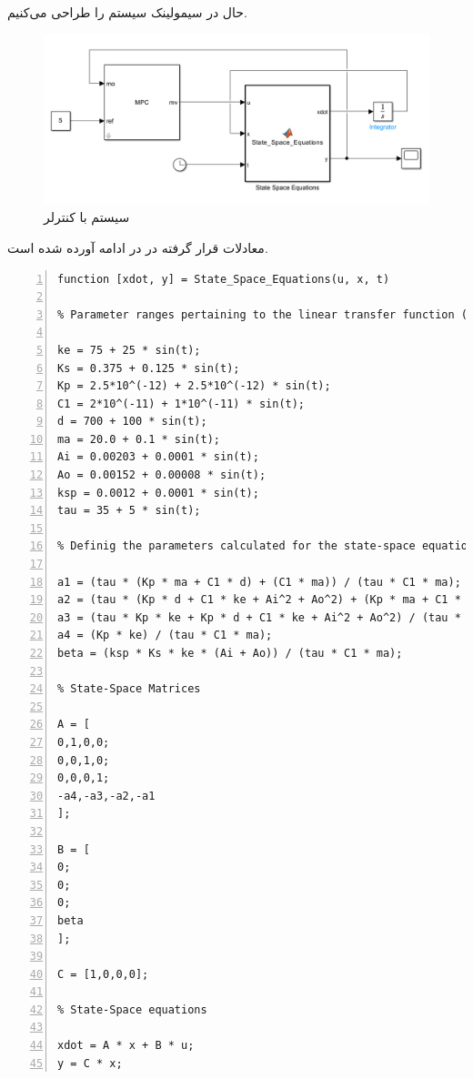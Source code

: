 \documentclass[14pt, a4paper]{extarticle}
\begin{document}
حال در سیمولینک سیستم را طراحی می‌کنیم.\\
\begin{figure}[h!]
	\centering
	\includegraphics[scale = 0.6]{Q1_2_sim.png}
	\caption{سیستم با کنترلر 
	}
\end{figure}
\newpage
معادلات قرار گرفته در 
در ادامه آورده شده است.\\
\begin{latin}
	\begin{lstlisting}[frame=single,numbers=left,style=Matlab-Pyglike]
function [xdot, y] = State_Space_Equations(u, x, t)

% Parameter ranges pertaining to the linear transfer function (Table 1)

ke = 75 + 25 * sin(t);
Ks = 0.375 + 0.125 * sin(t);
Kp = 2.5*10^(-12) + 2.5*10^(-12) * sin(t);
C1 = 2*10^(-11) + 1*10^(-11) * sin(t);
d = 700 + 100 * sin(t);
ma = 20.0 + 0.1 * sin(t);
Ai = 0.00203 + 0.0001 * sin(t);
Ao = 0.00152 + 0.00008 * sin(t);
ksp = 0.0012 + 0.0001 * sin(t);
tau = 35 + 5 * sin(t);      

% Definig the parameters calculated for the state-space equations

a1 = (tau * (Kp * ma + C1 * d) + (C1 * ma)) / (tau * C1 * ma);
a2 = (tau * (Kp * d + C1 * ke + Ai^2 + Ao^2) + (Kp * ma + C1 * d)) / (tau * C1 * ma);
a3 = (tau * Kp * ke + Kp * d + C1 * ke + Ai^2 + Ao^2) / (tau * C1 * ma);
a4 = (Kp * ke) / (tau * C1 * ma);
beta = (ksp * Ks * ke * (Ai + Ao)) / (tau * C1 * ma);

% State-Space Matrices

A = [
0,1,0,0;
0,0,1,0;
0,0,0,1;
-a4,-a3,-a2,-a1
];

B = [
0;
0;
0;
beta
];

C = [1,0,0,0]; 

% State-Space equations

xdot = A * x + B * u;
y = C * x;
	\end{lstlisting}
\end{latin}
\end{document}
